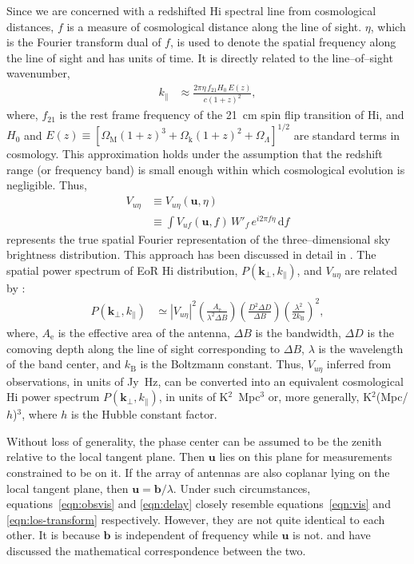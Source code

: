 \documentclass[preprint2,iop,numberedappendix,twocolappendix,appendixfloats]{emulateapj}
\newcommand{\dif}{\mathrm{d}}
\begin{document}
Since we are concerned with a redshifted H{\sc i} spectral line from cosmological distances, $f$ is a measure of cosmological distance along the line of sight. $\eta$, which is the Fourier transform dual of $f$, is used to denote the spatial frequency along the line of sight and has units of time. It is directly related to the line--of--sight wavenumber, 
\begin{align}\label{eqn:k-prll}
  k_\parallel &\approx \frac{2\pi\eta\,f_{21}H_0\,E(z)}{c(1+z)^2}, 
\end{align}
where, $f_{21}$ is the rest frame frequency of the 21~cm spin flip transition of H{\sc i}, and $H_0$ and $E(z)\equiv [\Omega_\textrm{M}(1+z)^3+\Omega_\textrm{k}(1+z)^2+\Omega_\Lambda]^{1/2}$ are standard terms in cosmology. This approximation holds under the assumption that the redshift range (or frequency band) is small enough within which cosmological evolution is negligible. Thus,
\begin{align}\label{eqn:los-transform}
  V_{u\eta} &\equiv V_{u\eta}(\boldsymbol{u},\eta) \nonumber\\
  &\equiv \int V_{uf}(\boldsymbol{u},f)\,W'_f\,e^{i2\pi f\eta}\,\dif f
\end{align}
represents the true spatial Fourier representation of the three--dimensional sky brightness distribution. This approach has been discussed in detail in \citet{mor04}. The spatial power spectrum of EoR H{\sc i} distribution, $P(\boldsymbol{k}_\perp,k_\parallel)$, and $V_{u\eta}$ are related by \citep{mor04,mcq06,par12a}: 
\begin{align}\label{eqn:true-power_spectrum}
  P(\boldsymbol{k}_\perp,k_\parallel) &\simeq |V_{u\eta}|^2\left(\frac{A_\textrm{e}}{\lambda^2\Delta B}\right)\left(\frac{D^2\Delta D}{\Delta B}\right)\left(\frac{\lambda^2}{2k_\textrm{B}}\right)^2,
\end{align}
where, $A_\textrm{e}$ is the effective area of the antenna, $\Delta B$ is the bandwidth, $\Delta D$ is the comoving depth along the line of sight corresponding to $\Delta B$, $\lambda$ is the wavelength of the band center, and $k_\textrm{B}$ is the Boltzmann constant. Thus, $V_{u\eta}$ inferred from observations, in units of Jy~Hz, can be converted into an equivalent cosmological H{\sc i} power spectrum $P(\boldsymbol{k}_\perp,k_\parallel)$, in units of K$^2$~Mpc$^3$ or, more generally, K$^2$(Mpc/$h$)$^3$, where $h$ is the Hubble constant factor.

Without loss of generality, the phase center can be assumed to be the zenith relative to the local tangent plane. Then $\boldsymbol{u}$ lies on this plane for measurements constrained to be on it. If the array of antennas are also coplanar lying on the local tangent plane, then $\boldsymbol{u}=\boldsymbol{b}/\lambda$. Under such circumstances, equations~\ref{eqn:obsvis} and \ref{eqn:delay} closely resemble equations~\ref{eqn:vis} and \ref{eqn:los-transform} respectively. However, they are not quite identical to each other. It is because $\boldsymbol{b}$ is independent of frequency while $\boldsymbol{u}$ is not. \citet{par12b} and \citet{liu14a} have discussed the mathematical correspondence between the two. 



\end{document}
